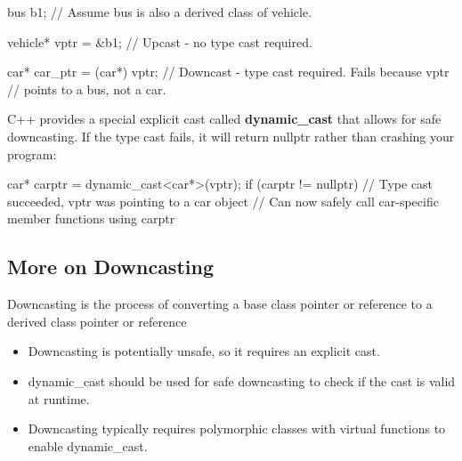 \documentclass{report}
\begin{document}
    \bigbreak \noindent 
    \begin{cppcode}
        bus b1;                       // Assume bus is also a derived class of vehicle.

        vehicle* vptr = &b1;          // Upcast - no type cast required.

        car* car_ptr = (car*) vptr;   // Downcast - type cast required. Fails because vptr
                                        // points to a bus, not a car.
    \end{cppcode}
    \bigbreak \noindent 
    C++ provides a special explicit cast called \textbf{dynamic\_cast} that allows for safe downcasting. If the type cast fails, it will return nullptr rather than crashing your program:
    \bigbreak \noindent 
    \begin{cppcode}
        car* carptr = dynamic_cast<car*>(vptr);
        if (carptr != nullptr)
        {
            // Type cast succeeded, vptr was pointing to a car object
            // Can now safely call car-specific member functions using carptr
        }
    \end{cppcode}
        \bigbreak \noindent 
    \subsection{More on Downcasting}
    \bigbreak \noindent 
    Downcasting is the process of converting a base class pointer or reference to a derived class pointer or reference
    \begin{itemize}
        \item Downcasting is potentially unsafe, so it requires an explicit cast.
        \item dynamic\_cast should be used for safe downcasting to check if the cast is valid at runtime.
        \item Downcasting typically requires polymorphic classes with virtual functions to enable dynamic\_cast.
    \end{itemize}
\end{document}
